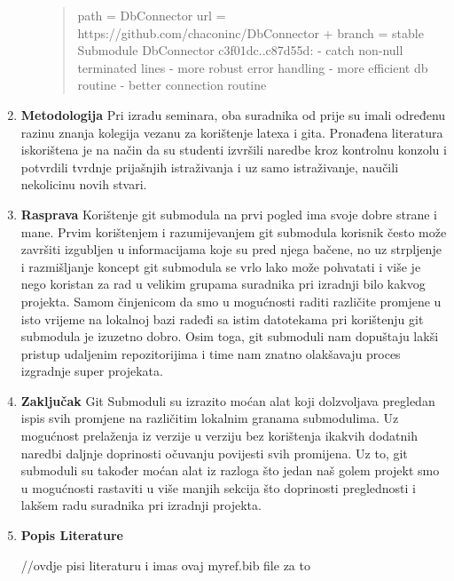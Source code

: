 \documentclass {article}
\begin{document}
\begin{enumerate}
\begin{enumerate}
\begin{quote}
\newline         path = DbConnector
\newline         url = https://github.com/chaconinc/DbConnector
\newline +       branch = stable
\newline Submodule DbConnector c3f01dc..c87d55d:
\newline   - catch non-null terminated lines
\newline   - more robust error handling
\newline   - more efficient db routine
\newline   - better connection routine
\newpage
    \end{quote}
      \end{enumerate}
\item {\textbf{Metodologija}}
\newline
\newline Pri izradu seminara, oba suradnika od prije su imali određenu razinu znanja kolegija vezanu za korištenje latexa i gita. Pronađena literatura iskorištena je na način da su studenti izvršili naredbe kroz kontrolnu konzolu i potvrdili tvrdnje prijašnjih istraživanja i uz samo istraživanje, naučili nekolicinu novih stvari.
\newline
\item {\textbf{Rasprava}}
\newline
\newline Korištenje git submodula na prvi pogled ima svoje dobre strane i mane. \newline Prvim korištenjem i razumijevanjem git submodula korisnik često može završiti izgubljen u informacijama koje su pred njega bačene, no uz strpljenje i razmišljanje koncept git submodula se vrlo lako može pohvatati i više je nego koristan za rad u velikim grupama suradnika pri izradnji bilo kakvog projekta. Samom činjenicom da smo u mogućnosti raditi različite promjene u isto vrijeme na lokalnoj bazi radeđi sa istim datotekama pri korištenju git submodula je izuzetno dobro. Osim toga, git submoduli nam dopuštaju lakši pristup udaljenim repozitorijima i time nam znatno olakšavaju proces izgradnje super projekata.
\newline
\item {\textbf{Zaključak}} \newline
\newline
Git Submoduli su izrazito moćan alat koji dolzvoljava pregledan ispis svih promjene na različitim lokalnim granama submodulima. Uz mogućnost prelaženja iz verzije u verziju bez korištenja ikakvih dodatnih naredbi daljnje doprinosti očuvanju povijesti svih promijena. Uz to, git submoduli su također moćan alat iz razloga što jedan naš golem projekt smo u mogućnosti rastaviti u više manjih sekcija što doprinosti preglednosti i lakšem radu suradnika pri izradnji projekta.
\newpage
\item{\textbf{Popis Literature}}

//ovdje pisi literaturu i imas ovaj myref.bib file za to



\end{enumerate}
\end{document}
